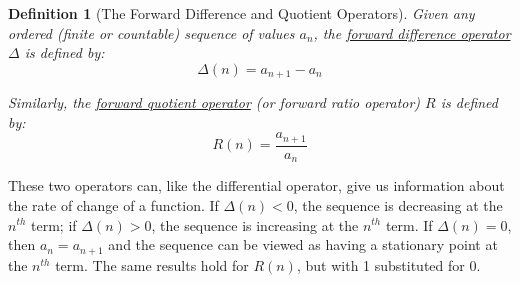 \documentclass[12pt,a4paper]{article}
\newtheorem{defn}[thm]{Definition}
\begin{document}
\begin{defn}[The Forward Difference and Quotient Operators]\vspace{1cm}

Given any ordered (finite or countable) sequence of values $a_n$, the \underline{forward difference operator} $\Delta$ is defined by:
$$\Delta(n) = a_{n+1}-a_n$$

Similarly, the \underline{forward quotient operator} (or forward ratio operator) $R$ is defined by:
$$R(n) = \frac{a_{n+1}}{a_n}$$

\end{defn}

These two operators can, like the differential operator, give us information about the rate of change of a function. If $\Delta(n) < 0$, the sequence is decreasing at the $n^{th}$ term; if $\Delta(n) > 0$, the sequence is increasing at the $n^{th}$ term. If $\Delta(n) = 0$, then $a_n = a_{n+1}$ and the sequence can be viewed as having a stationary point at the $n^{th}$ term. The same results hold for $R(n)$, but with 1 substituted for 0.
\end{document}
